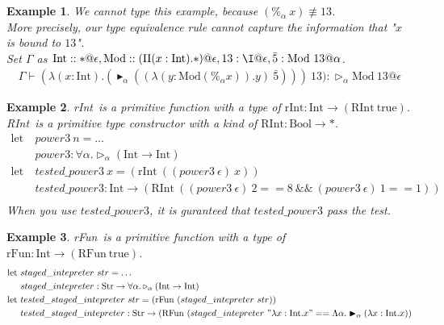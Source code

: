 \documentclass[9pt, a4paper]{extarticle}
\theoremstyle{break}
\newtheorem{ex}{Example}
\newcommand{\G}{\Gamma}
\newcommand{\V}{\vdash}
\newcommand{\TW}{\triangleright}
\newcommand{\TB}{\blacktriangleright}
\newcommand{\E}{\equiv}
\begin{document}
\begin{ex}
    \newcommand{\M}{\textrm{Mod}}
    \newcommand{\I}{\textrm{Int}}
    \newcommand{\GF}{\textrm{GF}}
    We cannot type this example, because $(\%_\alpha\ x) \not\E 13$.\\
    More precisely, our type equivalence rule cannot capture the information that "$x$ is bound to $13$".\\

    Set $\G$ as $\I::*@\epsilon,\M::(\Pi (x:\I).*)@\epsilon,13:\I@\epsilon,\bar{5}:\M\ 13@\alpha$.
    \begin{align*}
        \G\V
        (\lambda (x:\I).
        (\TB_\alpha ((\lambda (y:\M (\%_\alpha x)).y)\ \bar{5})))\ 13):\TW_\alpha \M\ 13@\epsilon
    \end{align*}
\end{ex}

\fi

\begin{ex}
    \newcommand{\I}{\textrm{Int}}
    \newcommand{\B}{\textrm{Bool}}
    \newcommand{\RI}{\textrm{RInt}}
    \newcommand{\rI}{\textrm{rInt}}
    \rI\ is a primitive function with a type of $\rI : \I \to (\RI\ \text{true})$.\\
    \RI\ is a primitive type constructor with a kind of $\RI : \B \to *$.
    \begin{align*}
        \text{let}\ & power3\ n = \hdots \\
        & power3 : \forall\alpha. \TW_\alpha(\I \to \I) \\
        \text{let}\ & tested\_power3\ x = (\rI\ ((power3\ \epsilon)\ x)) \\
        & tested\_power3 : \I \to (\RI\ ((power3\ \epsilon)\ 2 == 8\ \&\&\ (power3\ \epsilon)\ 1 == 1)) \\
    \end{align*}
    When you use $tested\_power3$, it is guranteed that $tested\_power3$ pass the test.
\end{ex}

\begin{ex}
    \newcommand{\I}{\textrm{Int}}
    \newcommand{\Exp}{\textrm{Str}}
    \newcommand{\RI}{\textrm{RFun}}
    \newcommand{\rI}{\textrm{rFun}}
    \rI\ is a primitive function with a type of $\rI : \I \to (\RI\ \text{true})$.
    \begin{align*}
        \text{let}\ & staged\_intepreter\ str = \hdots \\
        & staged\_intepreter : \Exp \to \forall\alpha.\TW_\alpha(\I \to \I) \\
        \text{let}\ & tested\_staged\_intepreter\ str = (\rI\ (staged\_intepreter\ str)) \\
        & tested\_staged\_intepreter : \Exp \to (\RI\ (staged\_intepreter\ "\lambda x:\I.x" == \Lambda\alpha.\TB_\alpha (\lambda x:\I.x)) \\
    \end{align*}
\end{ex}
\end{document}

